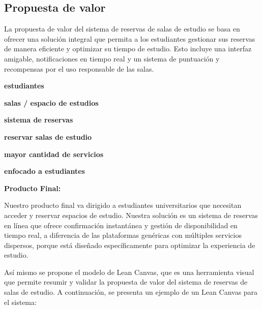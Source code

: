 \documentclass{article}
\begin{document}
      \subsection{Propuesta de valor}

      La propuesta de valor del sistema de reservas de salas de estudio se basa en ofrecer una solución integral que permita a los estudiantes gestionar sus reservas de manera eficiente y optimizar su tiempo de estudio. Esto incluye una interfaz amigable, notificaciones en tiempo real y un sistema de puntuación y recompensas por el uso responsable de las salas.

      \begin{description}[leftmargin=2cm,style=nextline]
        \item[Para] \textbf{estudiantes}
        \item[que necesitan] \textbf{salas / espacio de estudios}
        \item[nuestra solución es] \textbf{sistema de reservas}
        \item[que ofrece] \textbf{reservar salas de estudio}
        \item[a diferencia de] \textbf{mayor cantidad de servicios}
        \item[porque] \textbf{enfocado a estudiantes}
      \end{description}

      \newpage
      
      \noindent\textbf{Producto Final:}
      
      Nuestro producto final va dirigido a estudiantes universitarios que necesitan acceder y reservar espacios de estudio. Nuestra solución es un sistema de reservas en línea que ofrece confirmación instantánea y gestión de disponibilidad en tiempo real, a diferencia de las plataformas genéricas con múltiples servicios dispersos, porque está diseñado específicamente para optimizar la experiencia de estudio.

      Así mismo se propone el modelo de Lean Canvas, que es una herramienta visual que permite resumir y validar la propuesta de valor del sistema de reservas de salas de estudio. A continuación, se presenta un ejemplo de un Lean Canvas para el sistema:
\end{document}

